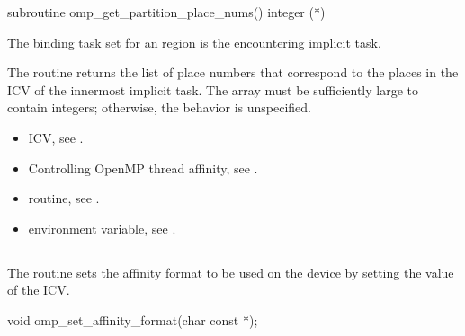 \begin{fortranspecific}
\begin{ompfSubroutine}
subroutine omp_get_partition_place_nums()
integer (*)
\end{ompfSubroutine}
\end{fortranspecific}

\binding
The binding task set for an  region 
is the encountering implicit task.

\effect
The  routine returns the list of
place numbers that correspond to the places in the 
ICV of the innermost implicit task. The array must be sufficiently large
to contain  integers; otherwise,
the behavior is unspecified.

\crossreferences
\begin{itemize}
\item {} ICV, see
.

\item Controlling OpenMP thread affinity, see
.

\item {} routine, see
.

\item {} environment variable, see
.
\end{itemize}



\subsection{}
\label{subsec:omp_set_affinity_format}

\summary
The  routine sets the affinity format to be 
used on the device by setting the value of the  ICV.

\format
\begin{ccppspecific}
\begin{ompcFunction}
void omp_set_affinity_format(char const *);
\end{ompcFunction}
\end{ccppspecific}

